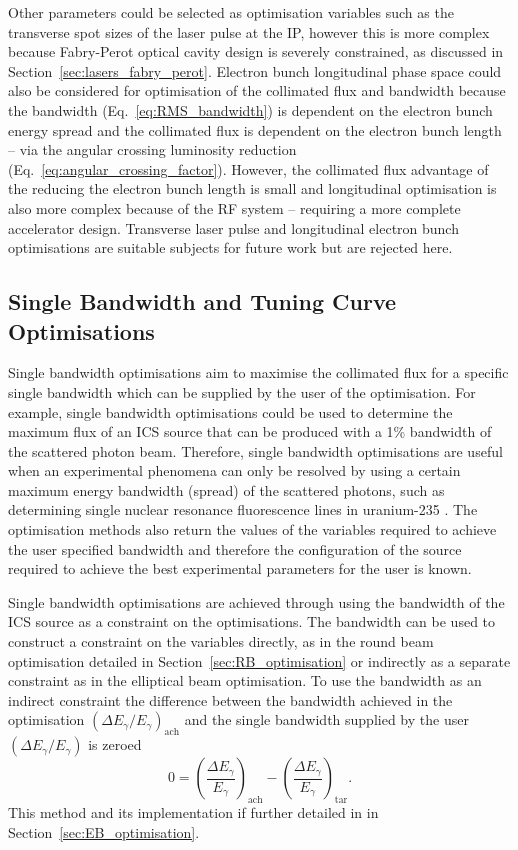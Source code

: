 \documentclass[../main.tex]{subfiles}
\begin{document}
Other parameters could be selected as optimisation variables such as the transverse spot sizes of the laser pulse at the IP, however this is more complex because Fabry-Perot optical cavity design is severely constrained, as discussed in Section~\ref{sec:lasers_fabry_perot}. Electron bunch longitudinal phase space could also be considered for optimisation of the collimated flux and bandwidth because the bandwidth (Eq.~\ref{eq:RMS_bandwidth}) is dependent on the electron bunch energy spread and the collimated flux is dependent on the electron bunch length -- via the angular crossing luminosity reduction (Eq.~\ref{eq:angular_crossing_factor}). However, the collimated flux advantage of the reducing the electron bunch length is small and longitudinal optimisation is also more complex because of the RF system -- requiring a more complete accelerator design. Transverse laser pulse and longitudinal electron bunch optimisations are suitable subjects for future work but are rejected here.  

\subsection{Single Bandwidth and Tuning Curve Optimisations}

Single bandwidth optimisations aim to maximise the collimated flux for a specific single bandwidth which can be supplied by the user of the optimisation. For example, single bandwidth optimisations could be used to determine the maximum flux of an ICS source that can be produced with a 1\% bandwidth of the scattered photon beam. Therefore, single bandwidth optimisations are useful when an experimental phenomena can only be resolved by using a certain maximum energy bandwidth (spread) of the scattered photons, such as determining single nuclear resonance fluorescence lines in uranium-235 \cite{hayakawa2010nondestructive}. The optimisation methods also return the values of the variables required to achieve the user specified bandwidth and therefore the configuration of the source required to achieve the best experimental parameters for the user is known.

Single bandwidth optimisations are achieved through using the bandwidth of the ICS source as a constraint on the optimisations. The bandwidth can be used to construct a constraint on the variables directly, as in the round beam optimisation detailed in Section~\ref{sec:RB_optimisation} or indirectly as a separate constraint as in the elliptical beam optimisation. To use the bandwidth as an indirect constraint the difference between the bandwidth achieved in the optimisation $\left(\Delta E_{\gamma}/E_{\gamma}\right)_{\mathrm{ach}}$ and the single bandwidth supplied by the user $\left(\Delta E_{\gamma}/E_{\gamma}\right)$ is zeroed
\begin{equation}
0 = \left(\frac{\Delta E_{\gamma}}{E_{\gamma}}\right)_{\mathrm{ach}} - \left(\frac{\Delta E_{\gamma}}{E_{\gamma}}\right)_{\mathrm{tar}}.
\label{eq:single_bandiwdth_constraint}
\end{equation}
This method and its implementation if further detailed in  in Section~\ref{sec:EB_optimisation}.
\end{document}
